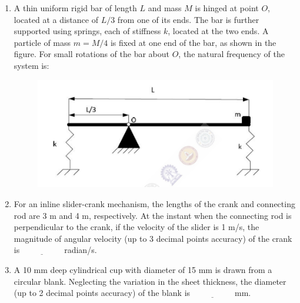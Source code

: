 \documentclass[journal]{IEEEtran}
\begin{document}
\begin{enumerate}[leftmargin=0pt]
    \item A thin uniform rigid bar of length $L$ and mass $M$ is hinged at point $O$, located at a distance of $L/3$ from one of its ends. The bar is further supported using springs, each of stiffness $k$, located at the two ends. A particle of mass $m = M/4$ is fixed at one end of the bar, as shown in the figure. For small rotations of the bar about $O$, the natural frequency of the system is:
    \begin{figure}[h]
    \centering
    \includegraphics[width=0.5\columnwidth]{Figs/image (29).png}
    \caption*{}
    \label{fig:46}
    \end{figure}
    \begin{enumerate}
    \end{enumerate}

    \item For an inline slider-crank mechanism, the lengths of the crank and connecting rod are 3 m and 4 m, respectively. At the instant when the connecting rod is perpendicular to the crank, if the velocity of the slider is 1 m/s, the magnitude of angular velocity (up to 3 decimal points accuracy) of the crank is $\underline{\hspace{2cm}}$ radian/s.

    \item A 10 mm deep cylindrical cup with diameter of 15 mm is drawn from a circular blank. Neglecting the variation in the sheet thickness, the diameter (up to 2 decimal points accuracy) of the blank is $\underline{\hspace{2cm}}$ mm.


\end{enumerate}
\end{document}
